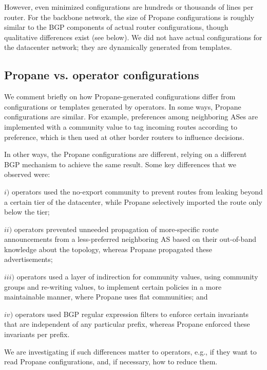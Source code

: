 \documentclass[10pt]{sigalternate052015}
\newcommand{\sysname}{{\small \sf Propane}\xspace}
\begin{document}
However, even minimized configurations are hundreds or thousands of lines per router. For the backbone network, the size of \sysname configurations is roughly similar to the BGP components of actual router configurations, though qualitative differences exist (see below). We did not have actual configurations for the datacenter network; they are dynamically generated from templates.


\subsection{Propane vs. operator configurations}

We comment briefly on how \sysname-generated configurations differ from configurations or templates generated by operators.
%
In some ways, \sysname configurations are similar. For example, preferences among neighboring ASes are implemented with a community value to tag incoming routes according to preference, which is then used at other border routers to influence decisions.

In other ways, the \sysname configurations are different, relying on a different BGP mechanism to achieve the same result. Some key differences that we observed were:

$i)$ operators used the no-export community to prevent routes from leaking beyond a certain tier of the datacenter, while \sysname selectively imported the route only below the tier;

$ii)$ operators prevented unneeded propagation of more-specific route announcements from a less-preferred neighboring AS based on their out-of-band knowledge about the topology, whereas \sysname propagated these advertisements;

$iii)$ operators used a layer of indirection for community values, using community groups and re-writing values, to implement certain policies in a more maintainable manner, where \sysname uses flat communities; and

$iv)$ operators used BGP regular expression filters to enforce certain invariants that are independent of any particular prefix, whereas \sysname enforced these invariants per prefix.

We are investigating if such differences matter to operators, e.g., if they want to read \sysname configurations, and, if necessary, how to reduce them.
\end{document}
